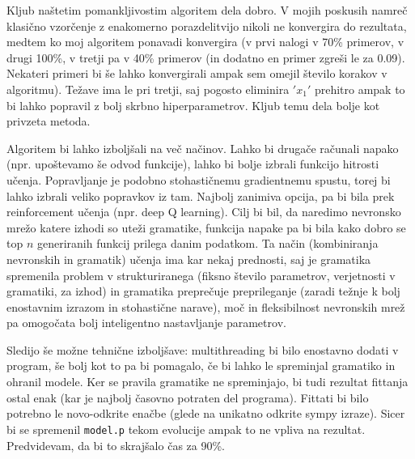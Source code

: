 \documentclass{article}
\begin{document}
Kljub naštetim pomankljivostim algoritem dela dobro. V mojih poskusih namreč klasično vzorčenje z enakomerno porazdelitvijo nikoli ne konvergira do rezultata, medtem ko moj algoritem ponavadi konvergira (v prvi nalogi v 70\% primerov, v drugi 100\%, v tretji pa v 40\% primerov (in dodatno en primer zgreši le za 0.09). Nekateri primeri bi še lahko konvergirali ampak sem omejil število korakov v algoritmu). Težave ima le pri tretji, saj pogosto eliminira \('x_1'\) prehitro ampak to bi lahko popravil z bolj skrbno hiperparametrov. Kljub temu dela bolje kot privzeta metoda.

Algoritem bi lahko izboljšali na več načinov. Lahko bi drugače računali napako (npr. upoštevamo še odvod funkcije), lahko bi bolje izbrali funkcijo hitrosti učenja. Popravljanje je podobno stohastičnemu gradientnemu spustu, torej bi lahko izbrali veliko popravkov iz tam. Najbolj zanimiva opcija, pa bi bila prek reinforcement učenja (npr. deep Q learning). Cilj bi bil, da naredimo nevronsko mrežo katere izhodi so uteži gramatike, funkcija napake pa bi bila kako dobro se top \(n\) generiranih funkcij prilega danim podatkom. Ta način (kombiniranja nevronskih in gramatik) učenja ima kar nekaj prednosti, saj je gramatika spremenila problem v strukturiranega (fiksno število parametrov, verjetnosti v gramatiki, za izhod) in gramatika preprečuje preprileganje (zaradi težnje k bolj enostavnim izrazom in stohastične narave), moč in fleksibilnost nevronskih mrež pa omogočata bolj inteligentno nastavljanje parametrov.

Sledijo še možne tehnične izboljšave: multithreading bi bilo enostavno dodati v program, še bolj kot to pa bi pomagalo, če bi lahko le spreminjal gramatiko in ohranil modele. Ker se pravila gramatike ne spreminjajo, bi tudi rezultat fittanja ostal enak (kar je najbolj časovno potraten del programa). Fittati bi bilo potrebno le novo-odkrite enačbe (glede na unikatno odkrite sympy izraze). Sicer bi se spremenil \texttt{model.p} tekom evolucije ampak to ne vpliva na rezultat. Predvidevam, da bi to skrajšalo čas za 90\%.
\end{document}
